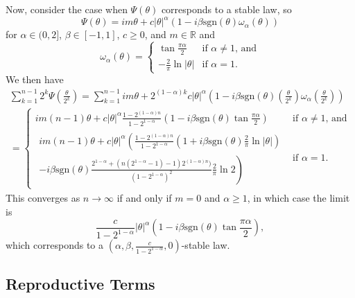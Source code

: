 \documentclass{article}
\theoremstyle{remark}
\theoremstyle{definition}
\begin{document}
Now, consider the case when $\Psi(\theta)$ corresponds to a stable law, so
\[
	\Psi(\theta) = im\theta + c|\theta|^{\alpha} (1-i\beta \text{sgn}(\theta)\omega_{\alpha}(\theta))
\]
for $\alpha \in (0,2]$, $\beta \in [-1,1]$, $c \geq 0$, and $m \in \mathbb{R}$ and
\[
	\omega_{\alpha}(\theta) = \begin{cases}
		\tan{\frac{\pi\alpha}{2}} & \text{if $\alpha \neq 1$, and}\\
		-\frac{2}{\pi}\ln{|\theta|} & \text{if $\alpha = 1$.}
	\end{cases}
\]
We then have
\begin{multline*}
	 \sum_{k=1}^{n-1}  {\textstyle 2^{k} \Psi\left(\frac{\theta}{2^{k}}\right)}
	 =  \sum_{k=1}^{n-1} im\theta + 2^{(1-\alpha)k} c|\theta|^{\alpha} {\textstyle\left(1-i \beta\text{sgn}(\theta)\left(\frac{\theta}{2^{k}}\right)
	 	 \omega_{\alpha}\left(\frac{\theta}{2^{k}}\right)\right)}\\
	= 
	\begin{cases}
		 im(n-1)\theta + c|\theta|^{\alpha}\frac{1-2^{(1-\alpha)n}}{1-2^{1-\alpha}}\left(1-i\beta \text{sgn}(\theta) \tan{\frac{\pi\alpha}{2}}\right) & \text{if $\alpha \neq 1$, and}\\	
		 \begin{multlined}
		 im(n-1)\theta + c|\theta|^{\alpha}  \left(\frac{1-2^{(1-\alpha)n}}{1-2^{1-\alpha}}
		 \left(1+i \beta \text{sgn}(\theta)\frac{2}{\pi}\ln{|\theta|} \right)\right.\\
		\left. -i\beta \text{sgn}(\theta) \frac{2^{1-\alpha} + (n(2^{1-\alpha}-1)-1)2^{(1-\alpha)n})}{(1-2^{1-\alpha})^{2}}\frac{2}{\pi}\ln{2}
		\right)    
		\end{multlined}
		& \text{if $\alpha = 1$.}
	\end{cases}
\end{multline*}
This converges as $n \to \infty$ if and only if $m = 0$ and $\alpha \ge 1$, in which case the limit is 
\[
	 \frac{c}{1-2^{1-\alpha}}|\theta|^{\alpha}\left(1-i\beta \text{sgn}(\theta) \tan{\frac{\pi\alpha}{2}}\right), 
\]
which corresponds to a $\left(\alpha,\beta, \frac{c}{1-2^{1-\alpha}},0\right)$-stable law.

\subsection{Reproductive Terms}
\end{document}
